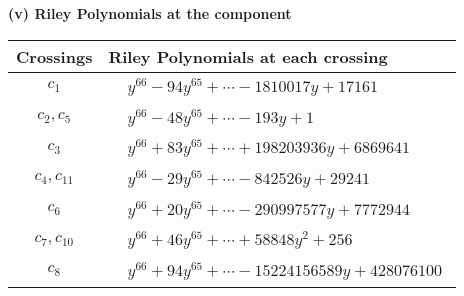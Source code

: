 \documentclass[1p]{elsarticle_modified}
\theoremstyle{definition}
\begin{document}
\newpage\renewcommand{\arraystretch}{1}
\flushleft \textbf{(v) Riley Polynomials at the component}\newline \\
\begin{tabular}{m{50pt}|m{274pt}}
Crossings & \hspace{64pt}Riley Polynomials at each crossing \\
\hline $$\begin{aligned}c_{1}\end{aligned}$$&$\begin{aligned}
&y^{66}-94 y^{65}+\cdots-1810017 y+17161
\end{aligned}$\\
\hline $$\begin{aligned}c_{2},c_{5}\end{aligned}$$&$\begin{aligned}
&y^{66}-48 y^{65}+\cdots-193 y+1
\end{aligned}$\\
\hline $$\begin{aligned}c_{3}\end{aligned}$$&$\begin{aligned}
&y^{66}+83 y^{65}+\cdots+198203936 y+6869641
\end{aligned}$\\
\hline $$\begin{aligned}c_{4},c_{11}\end{aligned}$$&$\begin{aligned}
&y^{66}-29 y^{65}+\cdots-842526 y+29241
\end{aligned}$\\
\hline $$\begin{aligned}c_{6}\end{aligned}$$&$\begin{aligned}
&y^{66}+20 y^{65}+\cdots-290997577 y+7772944
\end{aligned}$\\
\hline $$\begin{aligned}c_{7},c_{10}\end{aligned}$$&$\begin{aligned}
&y^{66}+46 y^{65}+\cdots+58848 y^2+256
\end{aligned}$\\
\hline $$\begin{aligned}c_{8}\end{aligned}$$&$\begin{aligned}
&y^{66}+94 y^{65}+\cdots-15224156589 y+428076100
\end{aligned}$\\

\end{tabular}
\end{document}
